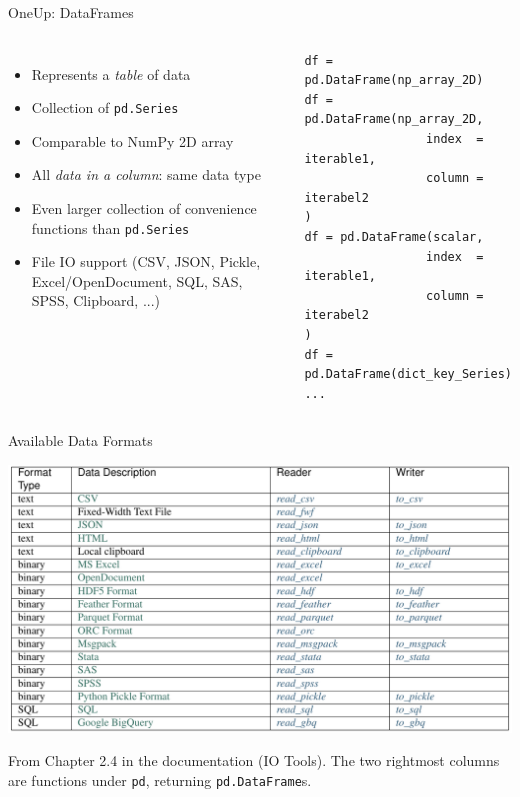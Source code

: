 
\begin{frame}[fragile]{OneUp: DataFrames}
%
\begin{columns}[T]
\begin{itemize}
\item Represents a \emph{table} of data
\item Collection of \texttt{pd.Series}
\item Comparable to NumPy 2D array
\item All \emph{data in a column}: same data type
\item Even larger collection of convenience functions than \texttt{pd.Series}
\item File IO support (CSV, JSON, Pickle, Excel/OpenDocument, SQL, SAS, SPSS, Clipboard, ...)
\end{itemize}
%
\begin{codebox}
\begin{verbatim}
df = pd.DataFrame(np_array_2D)
df = pd.DataFrame(np_array_2D,
                 index  = iterable1,
                 column = iterabel2
)
df = pd.DataFrame(scalar,
                 index  = iterable1,
                 column = iterabel2
)
df = pd.DataFrame(dict_key_Series)
...
\end{verbatim}
\end{codebox}
%
\end{columns}
%
\end{frame}


\begin{frame}{Available Data Formats}
%
\begin{center}
	\includegraphics[width=.75\linewidth]{./gfx/pandas-filecompat}
\end{center}
%
\scriptsize
From Chapter 2.4 in the documentation (IO Tools). The two rightmost columns are functions under \texttt{pd}, returning \texttt{pd.DataFrame}s.
%
\end{frame}

